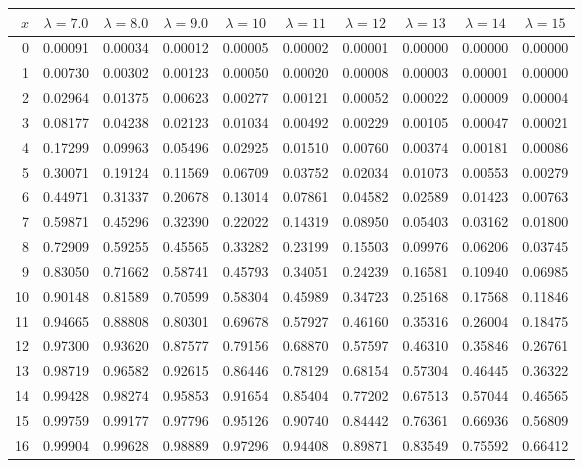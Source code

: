\myskip
\begin{tabular}{r|*{9}{c}}
$x$ &  $\lambda=7.0$  &  $\lambda=8.0$  &  $\lambda=9.0$  &  $\lambda=10$  &  $\lambda=11$
    &  $\lambda=12$  &  $\lambda=13$  &  $\lambda=14$  &  $\lambda=15$                    \\\hline
  0 & 0.00091 & 0.00034 & 0.00012 & 0.00005 & 0.00002 & 0.00001 & 0.00000 & 0.00000 & 0.00000 \\
  1 & 0.00730 & 0.00302 & 0.00123 & 0.00050 & 0.00020 & 0.00008 & 0.00003 & 0.00001 & 0.00000 \\
  2 & 0.02964 & 0.01375 & 0.00623 & 0.00277 & 0.00121 & 0.00052 & 0.00022 & 0.00009 & 0.00004 \\
  3 & 0.08177 & 0.04238 & 0.02123 & 0.01034 & 0.00492 & 0.00229 & 0.00105 & 0.00047 & 0.00021 \\
  4 & 0.17299 & 0.09963 & 0.05496 & 0.02925 & 0.01510 & 0.00760 & 0.00374 & 0.00181 & 0.00086 \\
  5 & 0.30071 & 0.19124 & 0.11569 & 0.06709 & 0.03752 & 0.02034 & 0.01073 & 0.00553 & 0.00279 \\
  6 & 0.44971 & 0.31337 & 0.20678 & 0.13014 & 0.07861 & 0.04582 & 0.02589 & 0.01423 & 0.00763 \\
  7 & 0.59871 & 0.45296 & 0.32390 & 0.22022 & 0.14319 & 0.08950 & 0.05403 & 0.03162 & 0.01800 \\
  8 & 0.72909 & 0.59255 & 0.45565 & 0.33282 & 0.23199 & 0.15503 & 0.09976 & 0.06206 & 0.03745 \\
  9 & 0.83050 & 0.71662 & 0.58741 & 0.45793 & 0.34051 & 0.24239 & 0.16581 & 0.10940 & 0.06985 \\
 10 & 0.90148 & 0.81589 & 0.70599 & 0.58304 & 0.45989 & 0.34723 & 0.25168 & 0.17568 & 0.11846 \\
 11 & 0.94665 & 0.88808 & 0.80301 & 0.69678 & 0.57927 & 0.46160 & 0.35316 & 0.26004 & 0.18475 \\
 12 & 0.97300 & 0.93620 & 0.87577 & 0.79156 & 0.68870 & 0.57597 & 0.46310 & 0.35846 & 0.26761 \\
 13 & 0.98719 & 0.96582 & 0.92615 & 0.86446 & 0.78129 & 0.68154 & 0.57304 & 0.46445 & 0.36322 \\
 14 & 0.99428 & 0.98274 & 0.95853 & 0.91654 & 0.85404 & 0.77202 & 0.67513 & 0.57044 & 0.46565 \\
 15 & 0.99759 & 0.99177 & 0.97796 & 0.95126 & 0.90740 & 0.84442 & 0.76361 & 0.66936 & 0.56809 \\
 16 & 0.99904 & 0.99628 & 0.98889 & 0.97296 & 0.94408 & 0.89871 & 0.83549 & 0.75592 & 0.66412 \\

\end{tabular}
